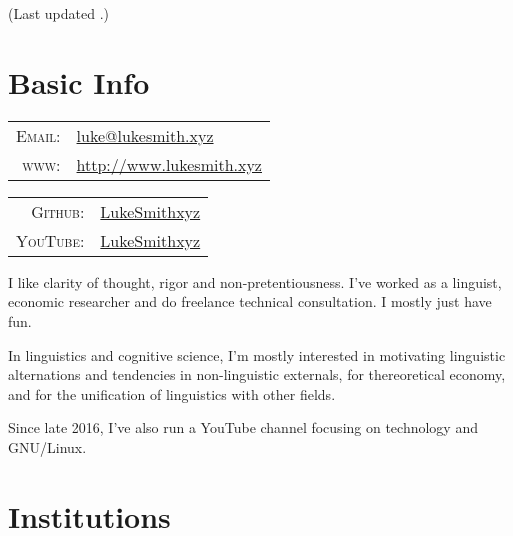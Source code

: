 \documentclass[letterpaper,10pt]{article}
\author{Luke Smith}
\date{\today}
\renewcommand{\maketitle}{
\par{\centering{\Huge  \textsc{\theauthor}}\par}
{\footnotesize\hfill{}\color{lightgray}(Last updated \thedate.)}}
\begin{document}
\maketitle

\section{Basic Info}

\vspace{.25cm}

\begin{minipage}[t]{.5\linewidth}

\begin{tabular}{rp{.75\linewidth}}
    \textsc{Email:}     & \href{mailto:luke@lukesmith.xyz}{luke@lukesmith.xyz}\\
    \textsc{www:}&\href{http://www.lukesmith.xyz}{http://www.lukesmith.xyz}
\end{tabular}
\end{minipage}
\begin{minipage}[t]{.5\linewidth}
\begin{tabular}{rl}
\textsc{Github:} & \href{http://github.com/LukeSmithxyz}{LukeSmithxyz}\\
\textsc{YouTube:}&\href{http://youtube.com/c/LukeSmithxyz}{LukeSmithxyz}
\end{tabular}
\end{minipage}

\vspace{.25cm}

I like clarity of thought, rigor and non-pretentiousness. I've worked as a linguist, economic researcher and do freelance technical consultation. I mostly just have fun.

\vspace{.25cm}

In linguistics and cognitive science, I'm mostly interested in motivating linguistic alternations and tendencies in non-linguistic externals, for thereoretical economy, and for the unification of linguistics with other fields.

\vspace{.25cm}

Since late 2016, I've also run a YouTube channel focusing on technology and GNU/Linux.

\section{Institutions}
\end{document}
